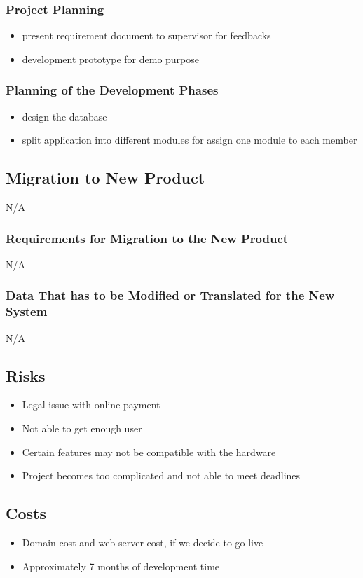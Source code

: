 \documentclass[12pt, titlepage]{article}
\begin{document}
{\subsubsection{Project Planning}
\begin{itemize}
	\item present requirement document to supervisor for feedbacks
	\item development prototype for demo purpose
\end{itemize}
\subsubsection{Planning of the Development Phases}
\begin{itemize}
		\item design the database
		\item split application into different modules for assign one module to each member
\end{itemize}
\subsection{Migration to New Product}
N/A
\subsubsection{Requirements for Migration to the New Product}
N/A
\subsubsection{Data That has to be Modified or Translated for the New System}
N/A
\subsection{Risks}
\begin{itemize}
	\item Legal issue with online payment
	\item Not able to get enough user
	\item Certain features may not be compatible with the hardware
	\item Project becomes too complicated and not able to meet deadlines
\end{itemize}
\subsection{Costs}
\begin{itemize}
	\item Domain cost and web server cost, if we decide to go live
	\item Approximately 7 months of development time
\end{itemize}
}
\end{document}

